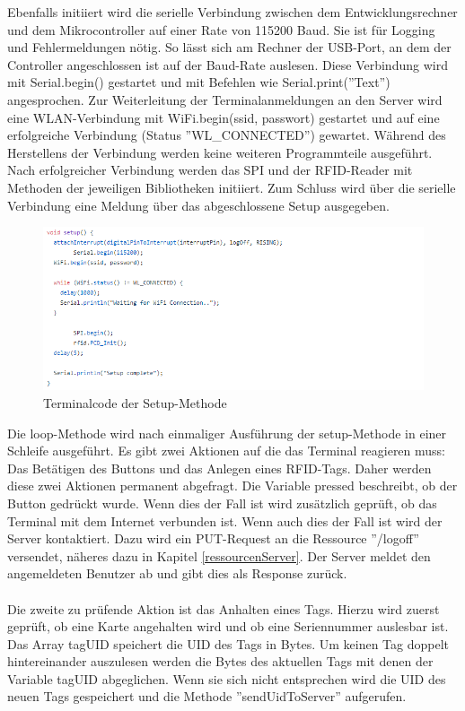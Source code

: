 \documentclass[12pt,titlepage]{scrartcl}
\begin{document}
		Ebenfalls initiiert wird die serielle Verbindung zwischen dem Entwicklungsrechner und dem Mikrocontroller auf einer Rate von 115200 Baud. Sie ist für Logging und Fehlermeldungen nötig. So lässt sich am Rechner der USB-Port, an dem der Controller angeschlossen ist auf der Baud-Rate auslesen. Diese Verbindung wird mit Serial.begin() gestartet und mit Befehlen wie Serial.print(''Text'') angesprochen. Zur Weiterleitung der Terminalanmeldungen an den Server wird eine WLAN-Verbindung mit WiFi.begin(ssid, passwort) gestartet und auf eine erfolgreiche Verbindung (Status ''WL\_CONNECTED'') gewartet. Während des Herstellens der Verbindung werden keine weiteren Programmteile ausgeführt. Nach erfolgreicher Verbindung werden das SPI und der RFID-Reader mit Methoden der jeweiligen Bibliotheken initiiert. Zum Schluss wird über die serielle Verbindung eine Meldung über das abgeschlossene Setup ausgegeben. \\
			\begin{figure}[H] 
  			\centering
    		\includegraphics[height=0.3\textheight]{terminalSetup}
  			\caption{Terminalcode der Setup-Methode}
  			\label{fig:terminalSetup}
		\end{figure}
		\noindent Die loop-Methode wird nach einmaliger Ausführung der setup-Methode in einer Schleife ausgeführt. Es gibt zwei Aktionen auf die das Terminal reagieren muss: Das Betätigen des Buttons und das Anlegen eines RFID-Tags. Daher werden diese zwei Aktionen permanent abgefragt. Die Variable pressed beschreibt, ob der Button gedrückt wurde. Wenn dies der Fall ist wird zusätzlich geprüft, ob das Terminal mit dem Internet verbunden ist. Wenn auch dies der Fall ist wird der Server kontaktiert. Dazu wird ein PUT-Request an die Ressource ''/logoff'' versendet, näheres dazu in Kapitel \ref{ressourcenServer}. Der Server meldet den angemeldeten Benutzer ab und gibt dies als Response zurück. \\ \\
		Die zweite zu prüfende Aktion ist das Anhalten eines Tags. Hierzu wird zuerst geprüft, ob eine Karte angehalten wird und ob eine Seriennummer auslesbar ist. Das Array tagUID speichert die UID des Tags in Bytes. Um keinen Tag doppelt hintereinander auszulesen werden die Bytes des aktuellen Tags mit denen der Variable tagUID abgeglichen. Wenn sie sich nicht entsprechen wird die UID des neuen Tags gespeichert und die Methode ''sendUidToServer'' aufgerufen.  \\
\end{document}
